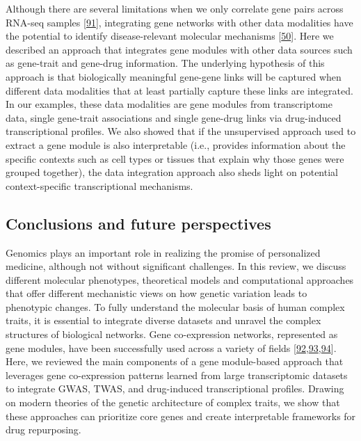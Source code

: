 Although there are several limitations when we only correlate gene pairs across RNA-seq samples {[}\protect\hyperlink{ref-jVQ2rMqc}{91}{]}, integrating gene networks with other data modalities have the potential to identify disease-relevant molecular mechanisms {[}\protect\hyperlink{ref-dg9nKuy0}{50}{]}.
Here we described an approach that integrates gene modules with other data sources such as gene-trait and gene-drug information.
The underlying hypothesis of this approach is that biologically meaningful gene-gene links will be captured when different data modalities that at least partially capture these links are integrated.
In our examples, these data modalities are gene modules from transcriptome data, single gene-trait associations and single gene-drug links via drug-induced transcriptional profiles.
We also showed that if the unsupervised approach used to extract a gene module is also interpretable (i.e., provides information about the specific contexts such as cell types or tissues that explain why those genes were grouped together), the data integration approach also sheds light on potential context-specific transcriptional mechanisms.

\hypertarget{conclusions-and-future-perspectives}{%
\subsection{Conclusions and future perspectives}\label{conclusions-and-future-perspectives}}

Genomics plays an important role in realizing the promise of personalized medicine, although not without significant challenges.
In this review, we discuss different molecular phenotypes, theoretical models and computational approaches that offer different mechanistic views on how genetic variation leads to phenotypic changes.
To fully understand the molecular basis of human complex traits, it is essential to integrate diverse datasets and unravel the complex structures of biological networks.
Gene co-expression networks, represented as gene modules, have been successfully used across a variety of fields {[}\protect\hyperlink{ref-CqvNaEqc}{92},\protect\hyperlink{ref-r8alvfcC}{93},\protect\hyperlink{ref-E1tpJnqG}{94}{]}.
Here, we reviewed the main components of a gene module-based approach that leverages gene co-expression patterns learned from large transcriptomic datasets to integrate GWAS, TWAS, and drug-induced transcriptional profiles.
Drawing on modern theories of the genetic architecture of complex traits, we show that these approaches can prioritize core genes and create interpretable frameworks for drug repurposing.


